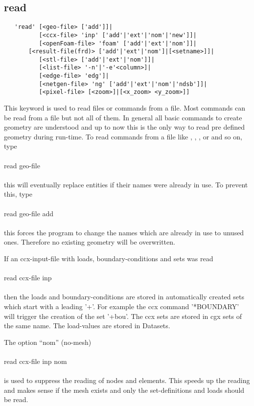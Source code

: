 \documentclass{article}
\begin{document}
\subsection{\label{read}read}
\begin{verbatim}
   'read' [<geo-file> ['add']]|
          [<ccx-file> 'inp' ['add'|'ext'|'nom'|'new']]|
          [<openFoam-file> 'foam' ['add'|'ext'|'nom']]|
       [<result-file(frd)> ['add'|'ext'|'nom']|[<setname>]]|
          [<stl-file> ['add'|'ext'|'nom']]|
          [<list-file> '-n'|'-e'<column>]|
          [<edge-file> 'edg']|
          [<netgen-file> 'ng' ['add'|'ext'|'nom'|'ndsb']]|
          [<pixel-file> [<zoom>]|[<x_zoom> <y_zoom>]]
\end{verbatim}
This keyword is used to read files or commands from a file. Most commands can be read from a file but not all of them. In general all basic commands to create geometry are understood and up to now this is the only way to read pre defined geometry during run-time. To read commands from a file like , , , or  and so on, type\\\\read geo-file\\\\this will eventually replace entities if their names were already in use. To prevent this, type\\\\read geo-file add\\\\this forces the program to change the names which are already in use to unused ones. Therefore no existing geometry will be overwritten.

If an ccx-input-file with loads, boundary-conditions and sets was read\\\\read ccx-file inp\\\\then the loads and boundary-conditions are stored in automatically created sets which start with a leading '+'. For example the ccx command '*BOUNDARY' will trigger the creation of the set '+bou'. The ccx sets are stored in cgx sets of the same name. The load-values are stored in Datasets.

The option ``nom'' (no-mesh)\\\\read ccx-file inp nom\\\\is used to suppress the reading of nodes and elements. This speeds up the reading and makes sense if the mesh exists and only the set-definitions and loads should be read. 
\end{document}
